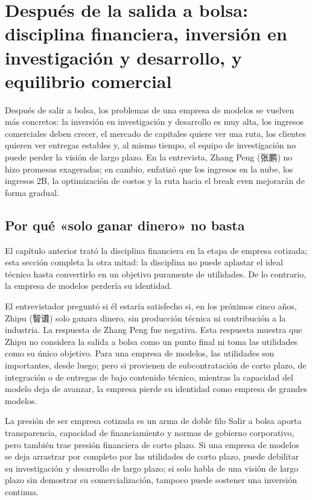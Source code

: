 \documentclass[a4paper]{article}
\begin{document}
\section{Después de la salida a bolsa: disciplina financiera, inversión en investigación y desarrollo, y equilibrio comercial}

Después de salir a bolsa, los problemas de una empresa de modelos se vuelven más concretos: la inversión en investigación y desarrollo es muy alta, los ingresos comerciales deben crecer, el mercado de capitales quiere ver una ruta, los clientes quieren ver entregas estables y, al mismo tiempo, el equipo de investigación no puede perder la visión de largo plazo. En la entrevista, Zhang Peng (张鹏) no hizo promesas exageradas; en cambio, enfatizó que los ingresos en la nube, los ingresos 2B, la optimización de costos y la ruta hacia el break even mejorarán de forma gradual.

\subsection{Por qué «solo ganar dinero» no basta}

El capítulo anterior trató la disciplina financiera en la etapa de empresa cotizada; esta sección completa la otra mitad: la disciplina no puede aplastar el ideal técnico hasta convertirlo en un objetivo puramente de utilidades. De lo contrario, la empresa de modelos perdería su identidad.

El entrevistador preguntó si él estaría satisfecho si, en los próximos cinco años, Zhipu (智谱) solo ganara dinero, sin producción técnica ni contribución a la industria. La respuesta de Zhang Peng fue negativa. Esta respuesta muestra que Zhipu no considera la salida a bolsa como un punto final ni toma las utilidades como su único objetivo. Para una empresa de modelos, las utilidades son importantes, desde luego; pero si provienen de subcontratación de corto plazo, de integración o de entregas de bajo contenido técnico, mientras la capacidad del modelo deja de avanzar, la empresa pierde su identidad como empresa de grandes modelos.

\begin{warningbox}{La presión de ser empresa cotizada es un arma de doble filo}
Salir a bolsa aporta transparencia, capacidad de financiamiento y normas de gobierno corporativo, pero también trae presión financiera de corto plazo. Si una empresa de modelos se deja arrastrar por completo por las utilidades de corto plazo, puede debilitar su investigación y desarrollo de largo plazo; si solo habla de una visión de largo plazo sin demostrar su comercialización, tampoco puede sostener una inversión continua.
\end{warningbox}
\end{document}
